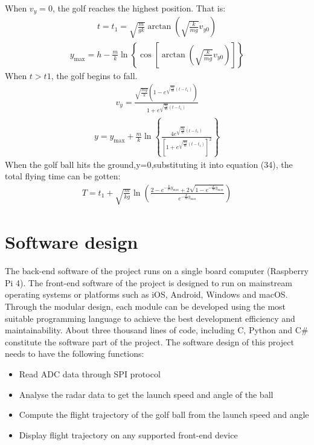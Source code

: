 When $v_{y}=0$, the golf reaches the highest position. That is:
\begin{align}
    t=t_{1}=\sqrt{\frac{m}{g k}} \arctan \left(\sqrt{\frac{k}{m g}} v_{y 0}\right)
\end{align}
\begin{align}
    y_{\max }=h-\frac{m}{k} \ln \left\{\cos \left[\arctan \left(\sqrt{\frac{k}{m g}} v_{y 0}\right)\right]\right\}
\end{align}
When $t>t 1$, the golf begins to fall.
\begin{align}
    v_{y}=\frac{\sqrt{\frac{m g}{k}}\left(1-e^{\sqrt{\frac{k g}{m}}\left(t-t_{1}\right)}\right)}{1+e^{\sqrt{\frac{k g}{m}}\left(t-t_{1}\right)}}
\end{align}
\begin{align}
    y=y_{\max }+\frac{m}{k} \ln \left\{\frac{4 e^{\sqrt{\frac{k g}{m}}\left(t-t_{1}\right)}}{\left[1+e^{\sqrt{\frac{k g}{m}}\left(t-t_{1}\right)}\right]^{2}}\right\}
\end{align}
When the golf ball hits the ground,y=0,substituting it into equation (34), the total flying time can be gotten:
\begin{align}
    T=t_{1}+\sqrt{\frac{m}{k g}} \ln \left(\frac{2-e^{-\frac{k}{m} y_{\max }}+2 \sqrt{1-e^{-\frac{k}{m} y_{\max }}}}{e^{-\frac{k}{m} y_{\max }}}\right)
\end{align}

\newpage
\section{Software design}
The back-end software of the project runs on a single board computer (Raspberry Pi 4). The front-end software of the project is designed to run on mainstream operating systems or platforms such as iOS, Android, Windows and macOS. Through the modular design, each module can be developed using the most suitable programming language to achieve the best development efficiency and maintainability. About three thousand lines of code, including C, Python and C\# constitute the software part of the project. The software design of this project needs to have the following functions: 
\begin{itemize}[noitemsep,topsep=0pt]
   \item Read ADC data through SPI protocol
   \item Analyse the radar data to get the launch speed and angle of the ball
   \item Compute the flight trajectory of the golf ball from the launch speed and angle
   \item Display flight trajectory on any supported front-end device
\end{itemize}
   
